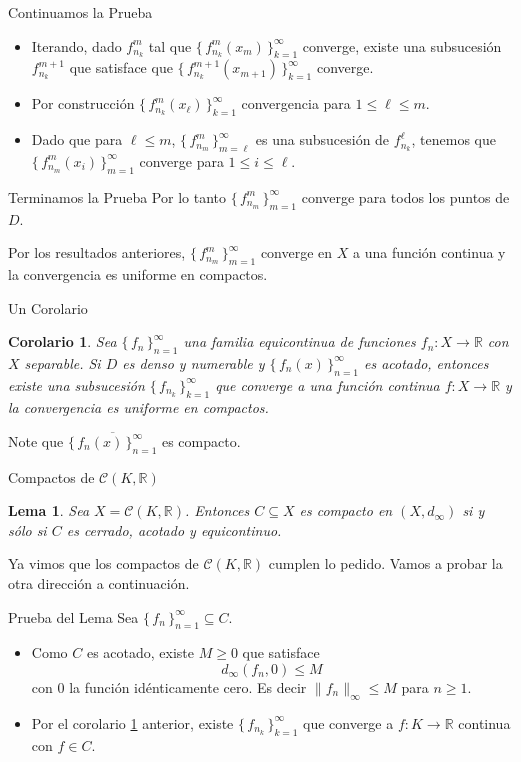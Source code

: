 \documentclass[utf8]{beamer}
\theoremstyle{plain}
\newtheorem{Lem}{Lema}                 %
\newtheorem{Cor}{Corolario}            %
\theoremstyle{definition}
\theoremstyle{remark}
\numberwithin{equation}{section}
\newcommand{\bR}{\mathbb{R}}    %
\newcommand{\cC}{\mathcal{C}}           %
\newcommand{\set}[1]{\{\,#1\,\}}    %
\renewcommand{\geq}{\geqslant}          %
\renewcommand{\l}{\ell}                   %
\renewcommand{\leq}{\leqslant}          %
\newcommand{\ov}{\overline}
\newcommand{\sucm}{_{m=1}^\infty} %
\newcommand{\suck}{_{k=1}^\infty} %
\newcommand{\sucn}{_{n=1}^\infty} %
\begin{document}
\begin{frame}{Continuamos la Prueba}
  \begin{itemize}
    \item Iterando, dado $f_{n_k}^m$ tal que $\set{f_{n_k}^m(x_m)}\suck$ converge, existe una subsucesión $f_{n_k}^{m+1}$ que satisface que $\set{f_{n_k}^{m+1}(x_{m+1})}\suck$ converge.
    \item Por construcción $\set{f_{n_k}^m(x_\l)}\suck$ convergencia para $1\leq \l\leq m$.
    \item Dado que para $\l\leq m$, $\set{f_{n_m}^m}_{m=\l}^\infty$ es una subsucesión de $f_{n_k}^\l$, tenemos que $\set{f_{n_m}^m(x_i)}_{m=1}^\infty$ converge para $1\leq i\leq \l$.
  \end{itemize}
\end{frame}

\begin{frame}{Terminamos la Prueba}
  Por lo tanto $\set{f_{n_m}^m}\sucm$ converge para todos los puntos de $D$.\par 
  Por los resultados anteriores, $\set{f_{n_m}^m}\sucm$ converge en $X$ a una función continua y la convergencia es uniforme en compactos.
\end{frame}


\begin{frame}{Un Corolario}
  \begin{Cor}\label{cor:ArzelaAscoliCor}
  Sea $\set{f_n}\sucn$ una familia equicontinua de funciones $f_n: X\to\bR$ con $X$ separable. Si $D$ es denso y numerable y $\set{f_n(x)}\sucn$ es acotado, entonces existe una subsucesión $\set{f_{n_k}}\suck$ que converge a una función continua $f:X\to\bR$ y la convergencia es uniforme en compactos.
  \end{Cor}
  Note que $\ov{\set{f_n(x)}\sucn}$ es compacto. 
\end{frame}

\begin{frame}{Compactos de $\cC(K,\bR)$}
  \begin{Lem}\label{lem:caractCompactosCKR}
    Sea $X=\cC(K,\bR)$. Entonces $C\subseteq X$ es compacto en $(X,d_\infty)$ si y sólo si $C$ es cerrado, acotado y equicontinuo.
  \end{Lem}  
  Ya vimos que los compactos de $\cC(K,\bR)$ cumplen lo pedido. Vamos a probar la otra dirección a continuación.
\end{frame}

\begin{frame}{Prueba del Lema}
  Sea $\set{f_n}\sucn\subseteq C$. 
  \begin{itemize}
    \item Como $C$ es acotado, existe $M\geq 0$ que satisface
    $$d_\infty(f_n,0)\leq M$$
    con $0$ la función idénticamente cero. Es decir $\|f_n\|_\infty\leq M$ para $n\geq 1$.
    \item Por el corolario \ref{cor:ArzelaAscoliCor} anterior, existe $\set{f_{n_k}}\suck$ que converge a $f: K\to\bR$ continua con $f\in C$.
  \end{itemize}
\end{frame}
\end{document}
